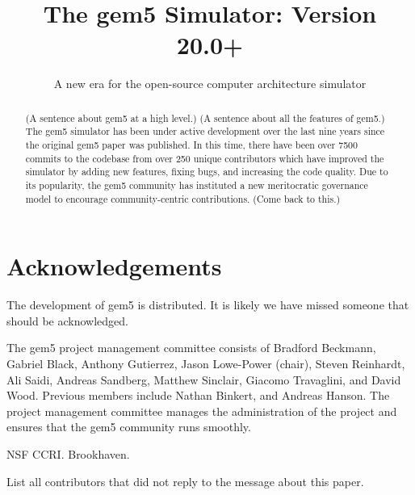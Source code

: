 \documentclass[manuscript, review, screen, timestamp]{acmart}
\begin{document}
\title{The gem5 Simulator: Version 20.0+}
\subtitle{A new era for the open-source computer architecture simulator}
%


\begin{abstract}
    (A sentence about gem5 at a high level.)
    (A sentence about all the features of gem5.)
    The gem5 simulator has been under active development over the last nine years since the original gem5 paper was published.
    In this time, there have been over 7500 commits to the codebase from over 250 unique contributors which have improved the simulator by adding new features, fixing bugs, and increasing the code quality.
    Due to its popularity, the gem5 community has instituted a new meritocratic governance model to encourage community-centric contributions.
    (Come back to this.)
\end{abstract}

\maketitle
\renewcommand{\shortauthors}{Lowe-Power and the gem5 Community}





\section{Acknowledgements}

The development of gem5 is distributed.
It is likely we have missed someone that should be acknowledged.

The gem5 project management committee consists of Bradford Beckmann, Gabriel Black, Anthony Gutierrez, Jason Lowe-Power (chair), Steven Reinhardt, Ali Saidi, Andreas Sandberg, Matthew Sinclair, Giacomo Travaglini, and David Wood.
Previous members include Nathan Binkert, and Andreas Hanson.
The project management committee manages the administration of the project and ensures that the gem5 community runs smoothly.

NSF CCRI. Brookhaven.

List all contributors that did not reply to the message about this paper.



\end{document}
